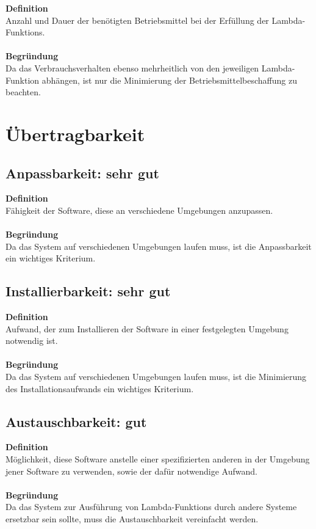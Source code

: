 \documentclass[a4paper,20pt,oneside]{book}
\begin{document}
\textbf{Definition} \\
Anzahl und Dauer der benötigten Betriebsmittel bei der Erfüllung der \glspl{Lambda-Funktion}. \\ \\
\textbf{Begründung} \\
Da das Verbrauchsverhalten ebenso mehrheitlich von den jeweiligen \gls{Lambda-Funktion} abhängen, ist nur die Minimierung der Betriebsmittelbeschaffung zu beachten.

\section{Übertragbarkeit}

\subsection{Anpassbarkeit: sehr gut}

\textbf{Definition} \\
Fähigkeit der Software, diese an verschiedene Umgebungen anzupassen. \\ \\
\textbf{Begründung} \\
Da das System auf verschiedenen Umgebungen laufen muss, ist die Anpassbarkeit ein wichtiges Kriterium.

\subsection{Installierbarkeit: sehr gut}

\textbf{Definition} \\
Aufwand, der zum Installieren der Software in einer festgelegten Umgebung notwendig ist. \\ \\
\textbf{Begründung} \\
Da das System auf verschiedenen Umgebungen laufen muss, ist die Minimierung des Installationsaufwands ein wichtiges Kriterium.

\subsection{Austauschbarkeit: gut}

\textbf{Definition} \\
Möglichkeit, diese Software anstelle einer spezifizierten anderen in der Umgebung jener Software zu verwenden, sowie der dafür notwendige Aufwand. \\ \\
\textbf{Begründung} \\
Da das System zur Ausführung von \glspl{Lambda-Funktion} durch andere Systeme ersetzbar sein sollte, muss die Austauschbarkeit vereinfacht werden.
\end{document}
